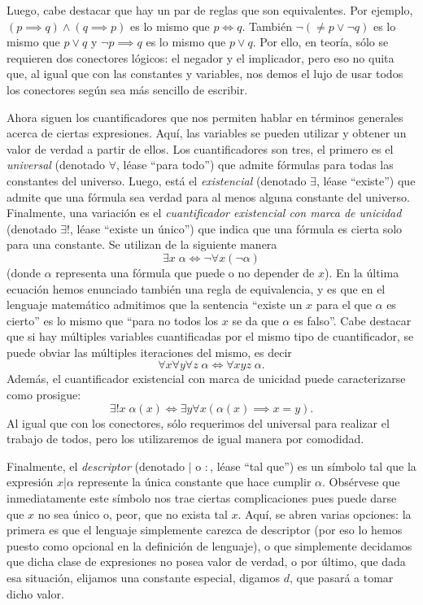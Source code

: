 \documentclass[11pt,a4paper]{book}
\begin{document}
Luego, cabe destacar que hay un par de reglas que son equivalentes. Por ejemplo, $(p\implies q)\wedge(q\implies p)$ es lo mismo que $p\iff q$. También $\neg(\neq p\vee\neg q)$ es lo mismo que $p\vee q$ y $\neg p\implies q$ es lo mismo que $p\vee q$. Por ello, en teoría, sólo se requieren dos conectores lógicos: el negador y el implicador, pero eso no quita que, al igual que con las constantes y variables, nos demos el lujo de usar todos los conectores según sea más sencillo de escribir.

Ahora siguen los cuantificadores que nos permiten hablar en términos generales acerca de ciertas expresiones. Aquí, las variables se pueden utilizar y obtener un valor de verdad a partir de ellos. Los cuantificadores son tres, el primero es el \textit{universal} (denotado $\forall$, léase ``para todo'') que admite fórmulas para todas las constantes del universo. Luego, está el \textit{existencial} (denotado $\exists$, léase ``existe'') que admite que una fórmula sea verdad para al menos alguna constante del universo. Finalmente, una variación es el \textit{cuantificador existencial con marca de unicidad} (denotado $\exists!$, léase ``existe un único'') que indica que una fórmula es cierta solo para una constante. Se utilizan de la siguiente manera
$$\exists x\;\alpha\iff\neg\forall x(\neg\alpha)$$
(donde $\alpha$ representa una fórmula que puede o no depender de $x$). En la última ecuación hemos enunciado también una regla de equivalencia, y es que en el lenguaje matemático admitimos que la sentencia ``existe un $x$ para el que $\alpha$ es cierto'' es lo mismo que ``para no todos los $x$ se da que $\alpha$ es falso''. Cabe destacar que si hay múltiples variables cuantificadas por el mismo tipo de cuantificador, se puede obviar las múltiples iteraciones del mismo, es decir
$$\forall x\forall y\forall z\;\alpha\iff\forall xyz\;\alpha.$$
Además, el cuantificador existencial con marca de unicidad puede caracterizarse como prosigue:
$$\exists!x\;\alpha(x)\iff\exists y\forall x(\alpha(x)\implies x=y).$$
Al igual que con los conectores, sólo requerimos del universal para realizar el trabajo de todos, pero los utilizaremos de igual manera por comodidad.

Finalmente, el \textit{descriptor} (denotado $|$ o $:$, léase ``tal que'') es un símbolo tal que la expresión $x|\alpha$ represente la única constante que hace cumplir $\alpha$. Obsérvese que inmediatamente este símbolo nos trae ciertas complicaciones pues puede darse que $x$ no sea único o, peor, que no exista tal $x$. Aquí, se abren varias opciones: la primera es que el lenguaje simplemente carezca de descriptor (por eso lo hemos puesto como opcional en la definición de lenguaje), o que simplemente decidamos que dicha clase de expresiones no posea valor de verdad, o por último, que dada esa situación, elijamos una constante especial, digamos $d$, que pasará a tomar dicho valor.
\end{document}
